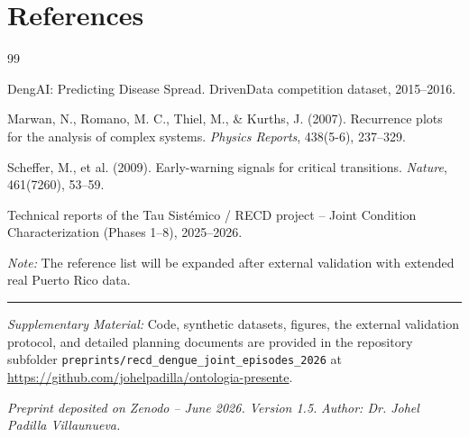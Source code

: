 \documentclass[11pt,a4paper]{article}
\begin{document}
\section*{References}
\begin{thebibliography}{99}

DengAI: Predicting Disease Spread. DrivenData competition dataset, 2015--2016.

Marwan, N., Romano, M. C., Thiel, M., \& Kurths, J. (2007). Recurrence plots for the analysis of complex systems. \textit{Physics Reports}, 438(5-6), 237--329.

Scheffer, M., et al. (2009). Early-warning signals for critical transitions. \textit{Nature}, 461(7260), 53--59.

Technical reports of the Tau Sistémico / RECD project – Joint Condition Characterization (Phases 1--8), 2025--2026.

\end{thebibliography}

\noindent\textit{Note:} The reference list will be expanded after external validation with extended real Puerto Rico data.

\vspace{0.6em}
\hrule
\vspace{0.5em}
\begin{sloppypar}
\noindent\textit{Supplementary Material:} Code, synthetic datasets, figures, the external validation protocol, and detailed planning documents are provided in the repository subfolder \texttt{preprints/recd\_dengue\_joint\_episodes\_2026} at \url{https://github.com/johelpadilla/ontologia-presente}.
\end{sloppypar}

\vspace{0.6em}
\noindent\textit{Preprint deposited on Zenodo – June 2026. Version 1.5.}  
\noindent\textit{Author: Dr. Johel Padilla Villaunueva.}
\end{document}
